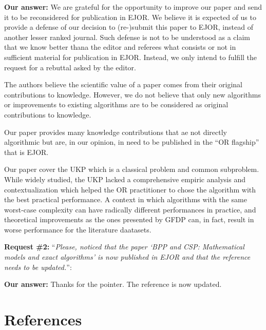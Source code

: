 \documentclass{elsarticle}
\begin{document}
\textbf{Our answer:} We are grateful for the opportunity to improve our paper and send it to be reconsidered for publication in EJOR.
We believe it is expected of us to provide a defense of our decision to (re-)submit this paper to EJOR, instead of another lesser ranked journal.
Such defense is not to be understood as a claim that we know better thana the editor and referees what consists or not in sufficient material for publication in EJOR.
Instead, we only intend to fulfill the request for a rebuttal asked by the editor.

The authors believe the scientific value of a paper comes from their original contributions to knowledge.
However, we do not believe that only new algorithms or improvements to existing algorithms are to be considered as original contributions to knowledge.

Our paper provides many knowledge contributions that ae not directly algorithmic but are, in our opinion, in need to be published in the ``OR flagship'' that is EJOR.

Our paper cover the UKP which is a classical problem and common subproblem. While widely studied, the UKP lacked a comprehensive empiric analysis and contextualization which helped the OR practitioner to chose the algorithm with the best practical performance. A context in which algorithms with the same worst-case complexity can have radically different performances in practice, and theoretical improvements as the ones presented by GFDP can, in fact, result in worse performance for the literature daatasets.

\textbf{Request \#2:} ``\textit{Please, noticed that the paper `BPP and CSP: Mathematical models and exact algorithms' is now published in EJOR and that the reference needs to be updated.}'':

\textbf{Our answer:} Thanks for the pointer. The reference is now updated.

\section{References}

%

\end{document}
